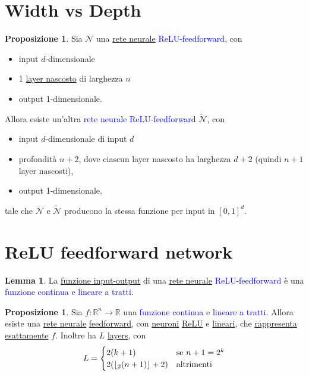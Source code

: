 \documentclass[10pt]{book}
\newcommand{\1}{\mathds{1}}
\newcommand{\R}{\mathds{R}}
\renewcommand{\tilde}[1]{\widetilde{#1}}
\newcommand{\floor}[1]{\left\lfloor #1 \right\rfloor}
\let\log\relax
\DeclareMathOperator{\log}{log}
\theoremstyle{definition}%
\newtheorem{lem}[thm]{Lemma}
\newtheorem{prop}[thm]{Proposizione}
\theoremstyle{plain}
\theoremstyle{remark}
\renewcommand{\href}[2]{\textcolor{blue}{#2}}
\begin{document}
\section{Width vs Depth}
\label{sec:org0a007f9}

\begin{prop}
Sia \(\mathcal{N}\) una \hyperref[sec:orgbb3f8c2]{rete neurale} \href{../../../../../org/roam/20250624155858-neurone_artificiale.org}{ReLU-feedforward}, con
\begin{itemize}
\item input \(d\)-dimensionale
\item 1 \hyperref[sec:orgeecc0b4]{layer nascosto} di larghezza \(n\)
\item output 1-dimensionale.
\end{itemize}

Allora esiste un'altra \href{../../../../../org/roam/20250624155858-neurone_artificiale.org}{rete neurale ReLU-feedforward} \(\tilde{\mathcal{N}}\), con
\begin{itemize}
\item input \(d\)-dimensionale di input \(d\)
\item profondità \(n+2\), dove ciascun layer nascosto ha larghezza \(d+2\) (quindi \(n+1\) layer nascosti),
\item output 1-dimensionale,
\end{itemize}
tale che \(\mathcal{N}\) e \(\tilde{\mathcal{N}}\) producono la stessa funzione per input in \([0,1]^{d}\).
\label{prop10.2.5}
\end{prop}
\section{ReLU feedforward network}
\label{sec:org2872d90}

\begin{lem}
La \hyperref[sec:orgbb3f8c2]{funzione input-output} di una \hyperref[sec:orgbb3f8c2]{rete neurale} \href{../../../../../org/roam/20250624155858-neurone_artificiale.org}{ReLU-feedforward} è una \href{../../../../../org/roam/20250103103252-funzione_continua.org}{funzione continua} e \href{../../../../../org/roam/20250701140551-funzione_lineare_a_tratti.org}{lineare a tratti}.
\label{lem10.2.6}
\end{lem}
\begin{prop}
Sia \(f:\R^{n}\to \R\) una \href{../../../../../org/roam/20250103103252-funzione_continua.org}{funzione continua} e \href{../../../../../org/roam/20250701140551-funzione_lineare_a_tratti.org}{lineare a tratti}. Allora esiste una \hyperref[sec:orgbb3f8c2]{rete neurale} \hyperref[sec:orgac723aa]{feedforward}, con \hyperref[sec:org779563c]{neuroni} \hyperref[sec:org4d22c92]{ReLU} e \hyperref[sec:org594e902]{lineari}, che \hyperref[sec:org0a7b3a7]{rappresenta esattamente} \(f\). Inoltre ha \(L\) \hyperref[sec:orgeecc0b4]{layers}, con
\begin{equation*}
L=\begin{cases}
2(k+1) & \text{se }n+1=2^{k}\\
2(\floor{\log_{2}(n+1)} + 2)&\text{altrimenti}
\end{cases}
\end{equation*}
\label{prop10.2.7}
\end{prop}
\end{document}
